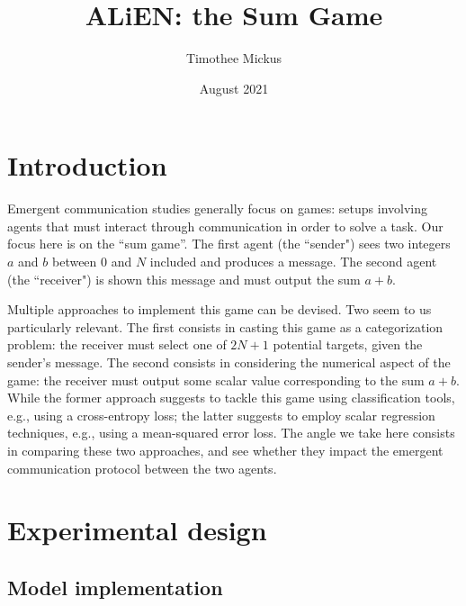 \documentclass[twocolumn]{article}
\title{ALiEN: the Sum Game}
\author{Timothee Mickus}
\date{August 2021}
\begin{document}
\maketitle

\section{Introduction}

Emergent communication studies generally focus on games: setups involving agents that must interact through communication in order to solve a task.
Our focus here is on the ``sum game''.
The first agent (the ``sender") sees two integers $a$ and $b$ between 0 and $N$ included and produces a message.
The second agent (the ``receiver") is shown this message and must output the sum $a+b$.

Multiple approaches to implement this game can be devised.
Two seem to us particularly relevant.
The first consists in casting this game as a categorization problem: the receiver must select one of $2N+1$ potential targets, given the sender's message.
The second consists in considering the numerical aspect of the game: the receiver must output some scalar value corresponding to the sum $a+b$.
While the former approach suggests to tackle this game using classification tools, e.g., using a cross-entropy loss; the latter suggests to employ scalar regression techniques, e.g., using a mean-squared error loss.
The angle we take here consists in comparing these two approaches, and see whether they impact the emergent communication protocol between the two agents.


\section{Experimental design} \label{sec:experiment}


\subsection{Model implementation} \label{sec:experiment:models}
\end{document}
